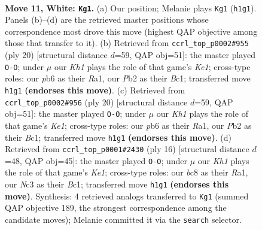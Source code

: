 \documentclass[11pt]{article}
\begin{document}
\begin{figure}[p]
\label{fig:thought-m18}
\end{figure}

\clearpage

\begin{figure}[p]\centering
\begin{subfigure}{0.46\textwidth}\centering
\resizebox{\linewidth}{!}{%
\newchessgame
\chessboard[
  setfen={r1bq1rk1/2pn1pb1/1p1p1np1/p2Pp2p/2P5/2N2NPB/PP2PP1P/R1BQ1R1K w - - 0 11},
  showmover=false,
  pgfstyle=straightmove, color=movearrow, markmove={h1-g1}
]}
\caption{}
\end{subfigure}\hfill
\begin{subfigure}{0.46\textwidth}\centering
\resizebox{\linewidth}{!}{%
\newchessgame
\chessboard[
  setfen={r1bq1rk1/1p1n1pbp/p2p1np1/2pP4/P3P3/2NB2N1/1P3PPP/R1BQK2R w KQ - 1 11},
  showmover=false,
  pgfstyle=straightmove, color=movearrow, markmove={e1-g1}
]}
\caption{}
\end{subfigure}
\\[4pt]
\begin{subfigure}{0.46\textwidth}\centering
\resizebox{\linewidth}{!}{%
\newchessgame
\chessboard[
  setfen={r1bq1rk1/1p1n1pbp/p2p1np1/2pP4/P3P3/2NB2N1/1P3PPP/R1BQK2R w KQ - 1 11},
  showmover=false,
  pgfstyle=straightmove, color=movearrow, markmove={e1-g1}
]}
\caption{}
\end{subfigure}\hfill
\begin{subfigure}{0.46\textwidth}\centering
\resizebox{\linewidth}{!}{%
\newchessgame
\chessboard[
  setfen={r1bq1rk1/1p1nppbp/p2p1np1/2pP4/P1B1P3/2N2N1P/1PP2PP1/R1BQK2R w KQ - 5 9},
  showmover=false,
  pgfstyle=straightmove, color=movearrow, markmove={e1-g1}
]}
\caption{}
\end{subfigure}
\caption{\textbf{Move 11, White: \texttt{Kg1}.} (a) Our position; Melanie plays \texttt{Kg1} (\texttt{h1g1}). Panels (b)--(d) are the retrieved master positions whose correspondence most drove this move (highest QAP objective among those that transfer to it). (b) Retrieved from \texttt{ccrl\_top\_p0002\#955} (ply 20) [structural distance $d$=59, QAP obj=51]: the master played \texttt{O-O}; under $\mu$ our \emph{Kh1} plays the role of that game's \emph{Ke1}; cross-type roles: our \emph{p}b6 as their \emph{R}a1, our \emph{P}b2 as their \emph{B}c1; transferred move \texttt{h1g1} \textbf{(endorses this move)}. (c) Retrieved from \texttt{ccrl\_top\_p0002\#956} (ply 20) [structural distance $d$=59, QAP obj=51]: the master played \texttt{O-O}; under $\mu$ our \emph{Kh1} plays the role of that game's \emph{Ke1}; cross-type roles: our \emph{p}b6 as their \emph{R}a1, our \emph{P}b2 as their \emph{B}c1; transferred move \texttt{h1g1} \textbf{(endorses this move)}. (d) Retrieved from \texttt{ccrl\_top\_p0001\#2430} (ply 16) [structural distance $d$=48, QAP obj=45]: the master played \texttt{O-O}; under $\mu$ our \emph{Kh1} plays the role of that game's \emph{Ke1}; cross-type roles: our \emph{b}c8 as their \emph{R}a1, our \emph{N}c3 as their \emph{B}c1; transferred move \texttt{h1g1} \textbf{(endorses this move)}. Synthesis: 4 retrieved analogs transferred to \texttt{Kg1} (summed QAP objective 189, the strongest correspondence among the candidate moves); Melanie committed it via the \texttt{search} selector.}

\end{figure}
\end{document}
